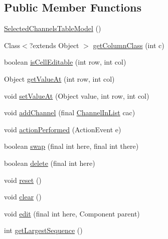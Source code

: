 \subsection*{Public Member Functions}
\begin{DoxyCompactItemize}
\item 
\hyperlink{classgov_1_1fnal_1_1ppd_1_1dd_1_1channel_1_1list_1_1table_1_1SelectedChannelsTableModel_a092efe9f1221d7f271c454d7b910e2be}{Selected\-Channels\-Table\-Model} ()
\item 
Class$<$?extends Object $>$ \hyperlink{classgov_1_1fnal_1_1ppd_1_1dd_1_1channel_1_1list_1_1table_1_1SelectedChannelsTableModel_a4309a29d07a7cd5aff870e6c9e991ecb}{get\-Column\-Class} (int c)
\item 
boolean \hyperlink{classgov_1_1fnal_1_1ppd_1_1dd_1_1channel_1_1list_1_1table_1_1SelectedChannelsTableModel_af27f38f128ef5b0b09f4438dff8b8b6c}{is\-Cell\-Editable} (int row, int col)
\item 
Object \hyperlink{classgov_1_1fnal_1_1ppd_1_1dd_1_1channel_1_1list_1_1table_1_1SelectedChannelsTableModel_a2e5ae1ac482230c4f6a1106a5837a3ee}{get\-Value\-At} (int row, int col)
\item 
void \hyperlink{classgov_1_1fnal_1_1ppd_1_1dd_1_1channel_1_1list_1_1table_1_1SelectedChannelsTableModel_afa88ade174ffaaa2711e87d43e03ad0c}{set\-Value\-At} (Object value, int row, int col)
\item 
void \hyperlink{classgov_1_1fnal_1_1ppd_1_1dd_1_1channel_1_1list_1_1table_1_1SelectedChannelsTableModel_a6d33f48664dd3d19c4547e76fe5f7b20}{add\-Channel} (final \hyperlink{interfacegov_1_1fnal_1_1ppd_1_1dd_1_1channel_1_1ChannelInList}{Channel\-In\-List} cac)
\item 
void \hyperlink{classgov_1_1fnal_1_1ppd_1_1dd_1_1channel_1_1list_1_1table_1_1SelectedChannelsTableModel_ae9015841439668435844739538e4efbb}{action\-Performed} (Action\-Event e)
\item 
boolean \hyperlink{classgov_1_1fnal_1_1ppd_1_1dd_1_1channel_1_1list_1_1table_1_1SelectedChannelsTableModel_a425682e41f6884211eeb8ac282aa20f6}{swap} (final int here, final int there)
\item 
boolean \hyperlink{classgov_1_1fnal_1_1ppd_1_1dd_1_1channel_1_1list_1_1table_1_1SelectedChannelsTableModel_ae93a046a5d3de36330302e02eb77e268}{delete} (final int here)
\item 
void \hyperlink{classgov_1_1fnal_1_1ppd_1_1dd_1_1channel_1_1list_1_1table_1_1SelectedChannelsTableModel_a18eb0afcee7ec9e06cab673fc5a9e83b}{reset} ()
\item 
void \hyperlink{classgov_1_1fnal_1_1ppd_1_1dd_1_1channel_1_1list_1_1table_1_1SelectedChannelsTableModel_a4827bcdd9d9c6287a9cde8abec7cb082}{clear} ()
\item 
void \hyperlink{classgov_1_1fnal_1_1ppd_1_1dd_1_1channel_1_1list_1_1table_1_1SelectedChannelsTableModel_a260df7c33ba7603f5b61de9fd6460a96}{edit} (final int here, Component parent)
\item 
int \hyperlink{classgov_1_1fnal_1_1ppd_1_1dd_1_1channel_1_1list_1_1table_1_1SelectedChannelsTableModel_a587affc6a89dab0a167a6eba68623314}{get\-Largest\-Sequence} ()
\end{DoxyCompactItemize}
